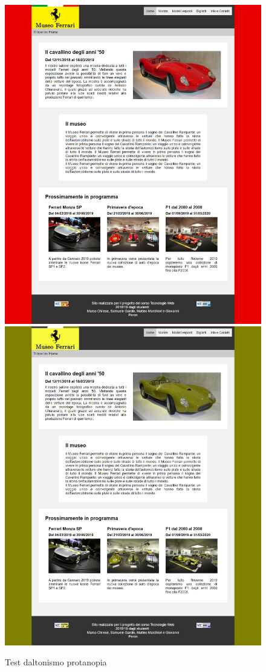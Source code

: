 \begin{figure}[!h]
	\begin{center}
		\includegraphics[scale=0.144]{Images/original.png}
		\includegraphics[scale=0.144]{Images/protanopia.png}
		\caption{Test daltonismo protanopia}
	\end{center}
\end{figure}
